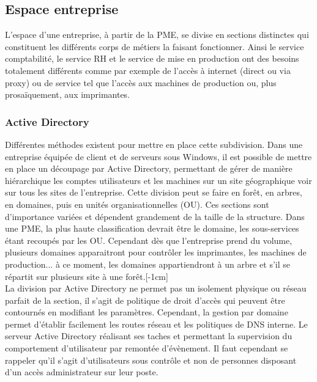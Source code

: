 \documentclass[twoside,a4paper,12pt,titlepage]{book}
\newcommand{\MarginPar}[2]{\marginnote{\scriptsize #1}[#2]}
\begin{document}
\subsection{Espace entreprise}
	L'espace d'une entreprise, à partir de la PME, se divise en sections distinctes qui constituent les différents corps de métiers la faisant fonctionner. Ainsi le service comptabilité, le service RH et le service de mise en production ont des besoins totalement différents comme par exemple de l'accès à internet (direct ou via proxy) ou de service tel que l'accès aux machines de production ou, plus prosaïquement, aux imprimantes. \\
	\subsubsection{Active Directory}
	Différentes méthodes existent pour mettre en place cette subdivision. Dans une entreprise équipée de client et de serveurs sous Windows, il est possible de mettre en place un découpage par Active Directory, permettant de gérer de manière hiérarchique les comptes utilisateurs et les machines sur un site géographique voir sur tous les sites de l'entreprise. Cette division peut se faire en forêt, en arbres, en domaines, puis en unités organisationnelles (OU). Ces sections sont d'importance variées et dépendent grandement de la taille de la structure. Dans une PME, la plus haute classification devrait être le domaine, les sous-services étant recoupés par les OU. Cependant dès que l'entreprise prend du volume, plusieurs domaines apparaitront pour contrôler les imprimantes, les machines de production... à ce moment, les domaines appartiendront à un arbre et s'il se répartit sur plusieurs site à une forêt.\MarginPar{\textbf{Active Directory:} Unités organisationnelles}{-1cm}\\
	La division par Active Directory ne permet pas un isolement physique ou réseau parfait de la section, il s'agit de politique de droit d'accès qui peuvent être contournés en modifiant les paramètres. Cependant, la gestion par domaine permet d'établir facilement les routes réseau et les politiques de DNS interne. Le serveur Active Directory réalisant ses taches et permettant la supervision du comportement d'utilisateur par remontée d'évènement. Il faut cependant se rappeler qu'il s'agit d'utilisateurs sous contrôle et non de personnes disposant d'un accès administrateur sur leur poste.
\end{document}
